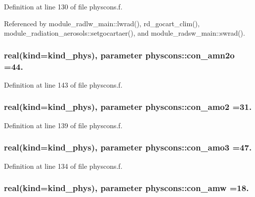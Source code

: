 Definition at line 130 of file physcons.\+f.



Referenced by module\+\_\+radlw\+\_\+main\+::lwrad(), rd\+\_\+gocart\+\_\+clim(), module\+\_\+radiation\+\_\+aerosols\+::setgocartaer(), and module\+\_\+radsw\+\_\+main\+::swrad().

\subsubsection[{\texorpdfstring{con\+\_\+amn2o}{con_amn2o}}]{\setlength{\rightskip}{0pt plus 5cm}real(kind=kind\+\_\+phys), parameter physcons\+::con\+\_\+amn2o =44.}\hypertarget{namespacephyscons_abb34f0d5a19aef4a975fb5b1e3141a7b}{}\label{namespacephyscons_abb34f0d5a19aef4a975fb5b1e3141a7b}


Definition at line 143 of file physcons.\+f.

\subsubsection[{\texorpdfstring{con\+\_\+amo2}{con_amo2}}]{\setlength{\rightskip}{0pt plus 5cm}real(kind=kind\+\_\+phys), parameter physcons\+::con\+\_\+amo2 =31.}\hypertarget{namespacephyscons_adffb549f49f2a2160ad3187ef75f60d5}{}\label{namespacephyscons_adffb549f49f2a2160ad3187ef75f60d5}


Definition at line 139 of file physcons.\+f.

\subsubsection[{\texorpdfstring{con\+\_\+amo3}{con_amo3}}]{\setlength{\rightskip}{0pt plus 5cm}real(kind=kind\+\_\+phys), parameter physcons\+::con\+\_\+amo3 =47.}\hypertarget{namespacephyscons_aa2a3f6c3591ab317abdc629b20c3f87f}{}\label{namespacephyscons_aa2a3f6c3591ab317abdc629b20c3f87f}


Definition at line 134 of file physcons.\+f.

\subsubsection[{\texorpdfstring{con\+\_\+amw}{con_amw}}]{\setlength{\rightskip}{0pt plus 5cm}real(kind=kind\+\_\+phys), parameter physcons\+::con\+\_\+amw =18.}\hypertarget{namespacephyscons_afcf5656ae531bc0a656bd079bfe157c3}{}\label{namespacephyscons_afcf5656ae531bc0a656bd079bfe157c3}


